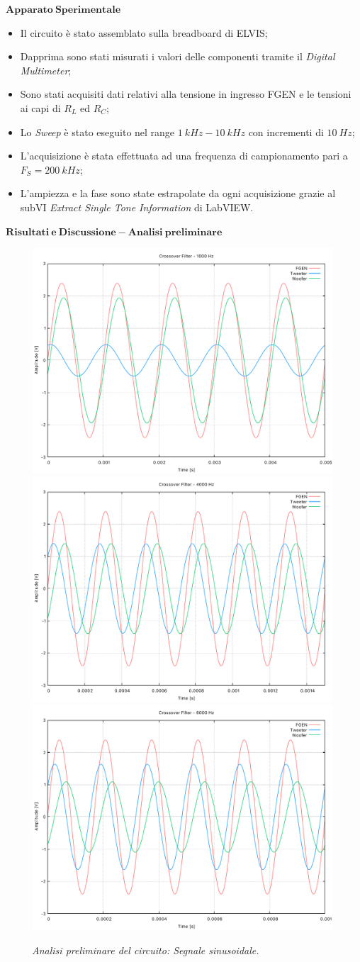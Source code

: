 \documentclass{beamer}
\begin{document}
\begin{frame}{$\mathbf{\  Apparato \ Sperimentale}$}
    \begin{itemize}
        \item <1-> Il circuito è stato assemblato sulla breadboard di ELVIS;
        \item <2-> Dapprima sono stati misurati i valori delle componenti tramite il \textit{Digital Multimeter};
        \item <3-> Sono stati acquisiti dati relativi alla tensione in ingresso FGEN e le tensioni ai capi di $R_L$ ed $R_C$;
        \item <4-> Lo \textit{Sweep} è stato eseguito nel range $1 \ kHz - 10 \ kHz$ con incrementi di $10 \ Hz$;
        \item <5-> L'acquisizione è stata effettuata ad una frequenza di campionamento pari a $F_S = 200 \ kHz$;
        \item <6-> L'ampiezza e la fase sono state estrapolate da ogni acquisizione grazie al subVI \textit{Extract Single Tone Information} di LabVIEW. 
    \end{itemize}
\end{frame}

\begin{frame}{$\mathbf{\  Risultati \ e \ Discussione - Analisi \ preliminare}$}
    \begin{figure}
        \includegraphics[width=0.45\linewidth]{../results/CF1000Hz.pdf}
        \includegraphics[width=0.45\linewidth]{../results/CF4000Hz.pdf}
        \includegraphics[width=0.45\linewidth]{../results/CF6000Hz.pdf}
        \caption{\textit{Analisi preliminare del circuito: Segnale sinusoidale.}}
    \end{figure}
\end{frame}
\end{document}
